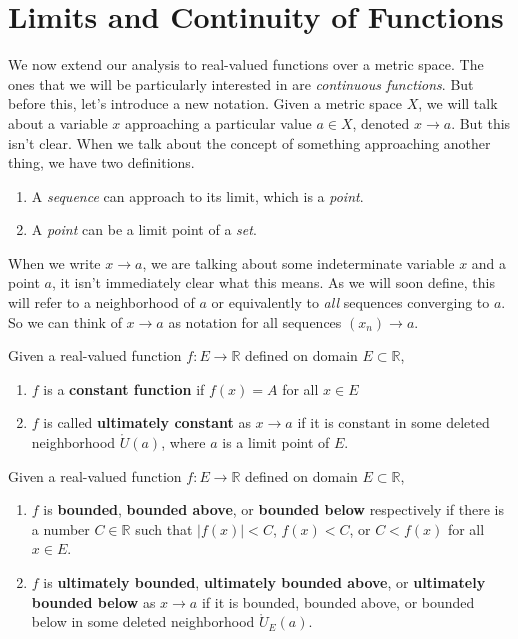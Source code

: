 \section{Limits and Continuity of Functions} 

  We now extend our analysis to real-valued functions over a metric space. The ones that we will be particularly interested in are \textit{continuous functions}. But before this, let's introduce a new notation. Given a metric space $X$, we will talk about a variable $x$ approaching a particular value $a \in X$, denoted $x \rightarrow a$. But this isn't clear. When we talk about the concept of something approaching another thing, we have two definitions. 
  \begin{enumerate}
    \item A \textit{sequence} can approach to its limit, which is a \textit{point}. 
    \item A \textit{point} can be a limit point of a \textit{set}. 
  \end{enumerate} 
  When we write $x \rightarrow a$, we are talking about some indeterminate variable $x$ and a point $a$, it isn't immediately clear what this means. As we will soon define, this will refer to a neighborhood of $a$ or equivalently to \textit{all} sequences converging to $a$. So we can think of $x \rightarrow a$ as notation for all sequences $(x_n) \rightarrow a$.   

  \begin{definition}
    Given a real-valued function $f: E \longrightarrow \mathbb{R}$ defined on domain $E \subset \mathbb{R}$,
    \begin{enumerate}
      \item $f$ is a \textbf{constant function} if $f(x) = A$ for all $x \in E$
      \item $f$ is called \textbf{ultimately constant} as $x \rightarrow a$ if it is constant in some deleted neighborhood $\mathring{U} (a)$, where $a$ is a limit point of $E$.
    \end{enumerate}
  \end{definition} 

  \begin{definition}
    Given a real-valued function $f: E \longrightarrow \mathbb{R}$ defined on domain $E \subset \mathbb{R}$,
    \begin{enumerate}
      \item $f$ is \textbf{bounded}, \textbf{bounded above}, or \textbf{bounded below} respectively if there is a number $C \in \mathbb{R}$ such that $|f(x)|<C$, $f(x)<C$, or $C<f(x)$ for all $x \in E$.

      \item $f$ is \textbf{ultimately bounded}, \textbf{ultimately bounded above}, or \textbf{ultimately bounded below} as $x \rightarrow a$ if it is bounded, bounded above, or bounded below in some deleted neighborhood $\mathring{U}_E (a)$. 
    \end{enumerate}
  \end{definition}

